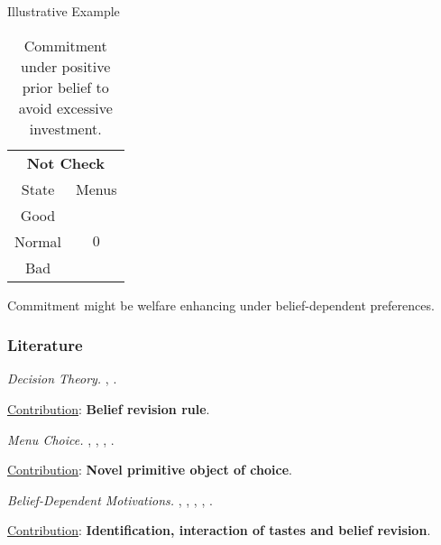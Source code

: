 \documentclass[usenames,dvipsnames,aspectratio=169,11pt, envcountsect, handout]{beamer}
\begin{document}
\begin{frame}[noframenumbering]{Illustrative Example}
\begin{table}[H]
		\begin{minipage}{0.29\textwidth}
			\centering
			\begin{tabular}{c | c}
				\multicolumn{2}{c}{\textbf{Not Check}} \\
				State  & Menus                         \\
				\hline
				Good   & \multirow{3}{*}{ \( 0 \)}     \\
				Normal &                               \\
				Bad    &                               \\
			\end{tabular}
			\vspace{0.5cm} %
		\end{minipage}
		\caption{Commitment under positive prior belief to avoid excessive investment.} %
		\label{tab:commitment}
	\end{table}

	\vfill

	Commitment might be welfare enhancing under belief-dependent preferences.

\end{frame}

\begin{frame}\frametitle{Literature}

	\begin{wideitemize}
		\item \textit{Decision Theory.} \cite{liangInformationdependentExpectedUtility2017}, \cite{dillenbergerAdditivebeliefbasedPreferences2020} \cite{rommeswinkelPreferenceKnowledge2023}.

		\vspace{0.3cm}
		\underline{Contribution}: \textbf{Belief revision rule}.
		\item \textit{Menu Choice.} \cite{gulTemptationSelfControl2001}, \cite{ozdenorenCompletingStateSpace2002}, \cite{epsteinAxiomaticModelNonBayesian2006}, \cite{epsteinColdFeet2007}.

		\vspace{0.3cm}
		\underline{Contribution}: \textbf{Novel primitive object of choice}.
		\item \textit{Belief-Dependent Motivations.} \cite{brunnermeierOptimalExpectations2005}, \cite{eliazCanAnticipatoryFeelings2006}, \cite{benabou2016mindful}, \cite{golmanInformationAvoidance2017}, \cite{battigalliBeliefdependentMotivationsPsychological2022}.

		\vspace{0.3cm}
		\underline{Contribution}: \textbf{Identification, interaction of tastes and belief revision}.
	\end{wideitemize}

\end{frame}
\end{document}
